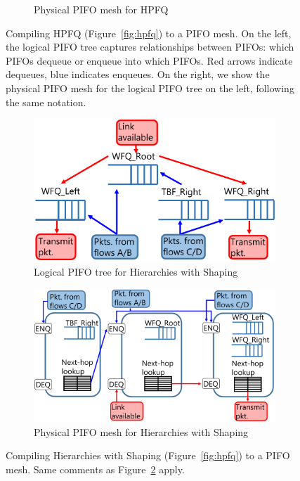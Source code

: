 \begin{figure}[!t]
\begin{subfigure}[b]{0.5\textwidth}
\begin{center}
  \caption{Physical PIFO mesh for HPFQ}
  \label{fig:hpfq_mesh}
  \end{center}
  \end{subfigure}
  \caption{Compiling HPFQ (Figure~\ref{fig:hpfq}) to a PIFO mesh. On the left,
  the logical PIFO tree captures relationships between PIFOs: which PIFOs dequeue
  or enqueue into which PIFOs. Red arrows indicate dequeues, blue indicates
  enqueues.  On the right, we show the physical PIFO mesh for the logical PIFO
  tree on the left, following the same notation.}
  \label{fig:hpfq_compiling}
\end{figure}


\begin{figure}[!t]
  \begin{subfigure}[b]{0.5\textwidth}
  \includegraphics[width=\textwidth]{pifo_hshaping_logical.pdf}
  \caption{Logical PIFO tree for Hierarchies with Shaping}
  \label{fig:hshaping_path}
  \end{subfigure}
  \begin{subfigure}[b]{0.5\textwidth}
  \includegraphics[width=\textwidth]{pifo_hshaping_physical.pdf}
  \caption{Physical PIFO mesh for Hierarchies with Shaping}
  \label{fig:hshaping_mesh}
  \end{subfigure}
  \caption{Compiling Hierarchies with Shaping (Figure~\ref{fig:hpfq}) to a PIFO mesh. Same comments as Figure~\ref{fig:hpfq_compiling} apply.}
\end{figure}


